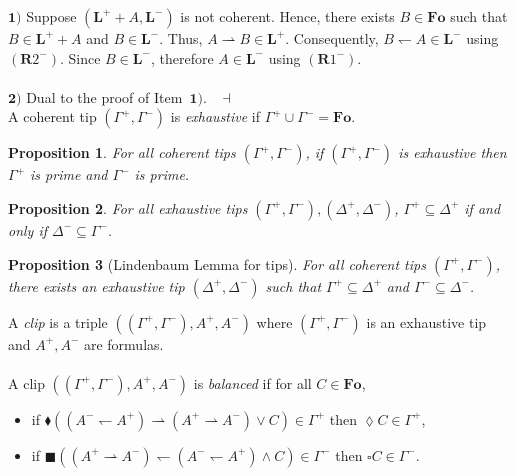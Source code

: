 \documentclass[draft]{article}
\newtheorem{proposition}{Proposition}
\newenvironment{proof}{{\bf Proof:}}{~$\dashv$\\}
\def\Rule{\mathbf{R}}
\def\Fo{\mathbf{Fo}}
\def\L{\mathbf{L}}
\begin{document}
%
%
\begin{proof}
%
%
$\mathbf{1)}$ Suppose $(\L^{+}{+}A,\L^{-})$ is not coherent.
Hence, there exists $B{\in}\Fo$ such that $B{\in}\L^{+}{+}A$ and $B{\in}\L^{-}$.
Thus, $A{\rightharpoonup}B{\in}\L^{+}$.
Consequently, $B{\leftharpoondown}A{\in}\L^{-}$ using $(\Rule2^{-})$.
Since $B{\in}\L^{-}$, therefore $A{\in}\L^{-}$ using $(\Rule1^{-})$.
%
%
\\
\\
%
%
$\mathbf{2)}$ Dual to the proof of Item~$\mathbf{1)}$.
%
%
\medskip
%
%
\end{proof}
%
%
A coherent tip $(\Gamma^{+},\Gamma^{-})$ is {\em exhaustive}\/ if $\Gamma^{+}{\cup}\Gamma^{-}{=}\Fo$.
%
%
\begin{proposition}\label{Proposition:let:be:a:tip:if:is:exhaustive:then:is:prime:and:is:prime}
%
%
For all coherent tips $(\Gamma^{+},\Gamma^{-})$, if $(\Gamma^{+},\Gamma^{-})$ is exhaustive then $\Gamma^{+}$ is prime and $\Gamma^{-}$ is prime.
%
%
\end{proposition}
%
%
\begin{proposition}\label{Proposition:for:all:exhaustive:tips:if:then:if:then}
%
%
For all exhaustive tips $(\Gamma^{+},\Gamma^{-}),(\Delta^{+},\Delta^{-})$, $\Gamma^{+}{\subseteq}\Delta^{+}$ if and only if $\Delta^{-}{\subseteq}\Gamma^{-}$.
%
%
\end{proposition}
%
%
\begin{proposition}[Lindenbaum Lemma for tips]\label{Proposition:for:all:coherent:tips:there:exists:an:exhaustive:tip:such:that:and}
%
%
For all coherent tips $(\Gamma^{+},\Gamma^{-})$, there exists an exhaustive tip $(\Delta^{+},\Delta^{-})$ such that $\Gamma^{+}{\subseteq}\Delta^{+}$ and $\Gamma^{-}{\subseteq}\Delta^{-}$.
%
%
\end{proposition}
%
%
%
%
A {\em clip}\/ is a triple $((\Gamma^{+},\Gamma^{-}),A^{+},A^{-})$ where $(\Gamma^{+},\Gamma^{-})$ is an exhaustive tip and $A^{+},A^{-}$ are formulas.
%
%
\\
\\
%
%
A clip $((\Gamma^{+},\Gamma^{-}),A^{+},A^{-})$ is {\em balanced}\/ if for all $C{\in}\Fo$,
%
%
\begin{itemize}
%
%
\item if ${\blacklozenge}((A^{-}{\leftharpoondown}A^{+}){\rightharpoonup}(A^{+}{\rightharpoonup}A^{-}){\vee}C){\in}\Gamma^{+}$ then ${\lozenge}C{\in}\Gamma^{+}$,
%
%
\item if ${\blacksquare}((A^{+}{\rightharpoonup}A^{-}){\leftharpoondown}(A^{-}{\leftharpoondown}A^{+}){\wedge}C){\in}\Gamma^{-}$ then ${\square}C{\in}\Gamma^{-}$.
%
%
\end{itemize}
\end{document}
